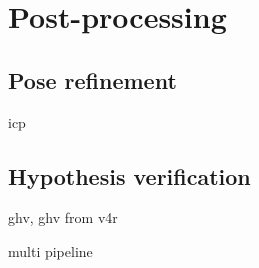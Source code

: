 
\chapter{Post-processing}
\label{cha:postproc}


\section{Pose refinement}
\label{sec:icp}

icp


\section{Hypothesis verification}
\label{sec:ghv}

ghv, ghv from v4r

multi pipeline